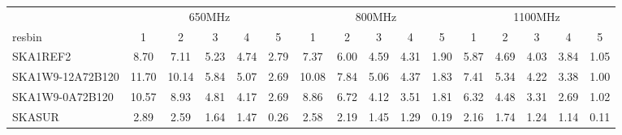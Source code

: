 \begin{table}[!htp]
{{\begin{tabular}{|lccccc||ccccc||ccccc|}
 \tabularnewline \cline{2-16} \multicolumn{1}{c}{ } & \multicolumn{5}{|c}{650MHz}  & \multicolumn{5}{c}{800MHz}  & \multicolumn{5}{c|}{1100MHz} \tabularnewline \cline{1-16} 
 resbin  &1 & 2 & 3 & 4 & 5 & 1 & 2 & 3 & 4 & 5 & 1 & 2 & 3 & 4 & 5 \tabularnewline \hline
SKA1REF2 & 8.70 \cellcolor{blue!45.70} & 7.11 \cellcolor{red!43.14} & 5.23 \cellcolor{green!53.90} & 4.74 \cellcolor{orange!56.15} & 2.79 \cellcolor{purple!60.00} & 7.37 \cellcolor{blue!44.82} & 6.00 \cellcolor{red!46.32} & 4.59 \cellcolor{green!54.53} & 4.31 \cellcolor{orange!59.18} & 1.90 \cellcolor{purple!60.00} & 5.87 \cellcolor{blue!47.68} & 4.69 \cellcolor{red!52.42} & 4.03 \cellcolor{green!57.32} & 3.84 \cellcolor{orange!60.00} & 1.05 \cellcolor{purple!60.00}\\ \hline 
SKA1W9-12A72B120 & 11.70 \cellcolor{blue!60.00} & 10.14 \cellcolor{red!60.00} & 5.84 \cellcolor{green!60.00} & 5.07 \cellcolor{orange!60.00} & 2.69 \cellcolor{purple!58.34} & 10.08 \cellcolor{blue!60.00} & 7.84 \cellcolor{red!60.00} & 5.06 \cellcolor{green!60.00} & 4.37 \cellcolor{orange!60.00} & 1.83 \cellcolor{purple!58.28} & 7.41 \cellcolor{blue!60.00} & 5.34 \cellcolor{red!60.00} & 4.22 \cellcolor{green!60.00} & 3.38 \cellcolor{orange!52.84} & 1.00 \cellcolor{purple!57.77}\\ \hline 
SKA1W9-0A72B120 & 10.57 \cellcolor{blue!54.61} & 8.93 \cellcolor{red!53.27} & 4.81 \cellcolor{green!49.70} & 4.17 \cellcolor{orange!49.50} & 2.69 \cellcolor{purple!58.34} & 8.86 \cellcolor{blue!53.17} & 6.72 \cellcolor{red!51.67} & 4.12 \cellcolor{green!49.06} & 3.51 \cellcolor{orange!48.27} & 1.81 \cellcolor{purple!57.79} & 6.32 \cellcolor{blue!51.28} & 4.48 \cellcolor{red!49.97} & 3.31 \cellcolor{green!47.17} & 2.69 \cellcolor{orange!42.11} & 1.02 \cellcolor{purple!58.66}\\ \hline 
SKASUR & 2.89 \cellcolor{blue!18.00} & 2.59 \cellcolor{red!18.00} & 1.64 \cellcolor{green!18.00} & 1.47 \cellcolor{orange!18.00} & 0.26 \cellcolor{purple!18.00} & 2.58 \cellcolor{blue!18.00} & 2.19 \cellcolor{red!18.00} & 1.45 \cellcolor{green!18.00} & 1.29 \cellcolor{orange!18.00} & 0.19 \cellcolor{purple!18.00} & 2.16 \cellcolor{blue!18.00} & 1.74 \cellcolor{red!18.00} & 1.24 \cellcolor{green!18.00} & 1.14 \cellcolor{orange!18.00} & 0.11 \cellcolor{purple!18.00}\tabularnewline \hline 
\end{tabular}}\hfil 
{}}
\end{table}
